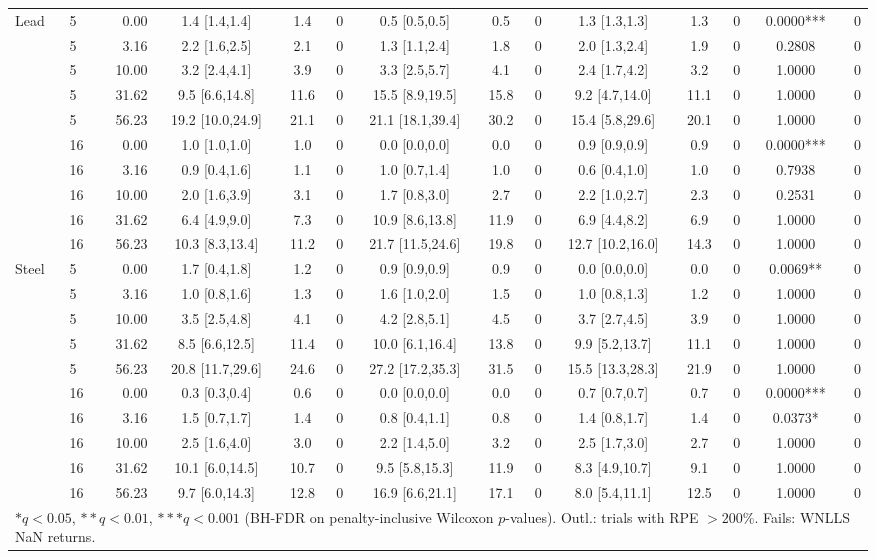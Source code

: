 \begin{table}[htbp]
\begin{tabular}{llr|ccc|ccc|ccc|cr}
\midrule Lead & 5 & 0.00 & 1.4 [1.4,1.4] & 1.4 & 0 & 0.5 [0.5,0.5] & 0.5 & 0 & 1.3 [1.3,1.3] & 1.3 & 0 & 0.0000*** & 0\\
 & 5 & 3.16 & 2.2 [1.6,2.5] & 2.1 & 0 & 1.3 [1.1,2.4] & 1.8 & 0 & 2.0 [1.3,2.4] & 1.9 & 0 & 0.2808 & 0\\
 & 5 & 10.00 & 3.2 [2.4,4.1] & 3.9 & 0 & 3.3 [2.5,5.7] & 4.1 & 0 & 2.4 [1.7,4.2] & 3.2 & 0 & 1.0000 & 0\\
 & 5 & 31.62 & 9.5 [6.6,14.8] & 11.6 & 0 & 15.5 [8.9,19.5] & 15.8 & 0 & 9.2 [4.7,14.0] & 11.1 & 0 & 1.0000 & 0\\
 & 5 & 56.23 & 19.2 [10.0,24.9] & 21.1 & 0 & 21.1 [18.1,39.4] & 30.2 & 0 & 15.4 [5.8,29.6] & 20.1 & 0 & 1.0000 & 0\\
 & 16 & 0.00 & 1.0 [1.0,1.0] & 1.0 & 0 & 0.0 [0.0,0.0] & 0.0 & 0 & 0.9 [0.9,0.9] & 0.9 & 0 & 0.0000*** & 0\\
 & 16 & 3.16 & 0.9 [0.4,1.6] & 1.1 & 0 & 1.0 [0.7,1.4] & 1.0 & 0 & 0.6 [0.4,1.0] & 1.0 & 0 & 0.7938 & 0\\
 & 16 & 10.00 & 2.0 [1.6,3.9] & 3.1 & 0 & 1.7 [0.8,3.0] & 2.7 & 0 & 2.2 [1.0,2.7] & 2.3 & 0 & 0.2531 & 0\\
 & 16 & 31.62 & 6.4 [4.9,9.0] & 7.3 & 0 & 10.9 [8.6,13.8] & 11.9 & 0 & 6.9 [4.4,8.2] & 6.9 & 0 & 1.0000 & 0\\
 & 16 & 56.23 & 10.3 [8.3,13.4] & 11.2 & 0 & 21.7 [11.5,24.6] & 19.8 & 0 & 12.7 [10.2,16.0] & 14.3 & 0 & 1.0000 & 0\\
\midrule Steel & 5 & 0.00 & 1.7 [0.4,1.8] & 1.2 & 0 & 0.9 [0.9,0.9] & 0.9 & 0 & 0.0 [0.0,0.0] & 0.0 & 0 & 0.0069** & 0\\
 & 5 & 3.16 & 1.0 [0.8,1.6] & 1.3 & 0 & 1.6 [1.0,2.0] & 1.5 & 0 & 1.0 [0.8,1.3] & 1.2 & 0 & 1.0000 & 0\\
 & 5 & 10.00 & 3.5 [2.5,4.8] & 4.1 & 0 & 4.2 [2.8,5.1] & 4.5 & 0 & 3.7 [2.7,4.5] & 3.9 & 0 & 1.0000 & 0\\
 & 5 & 31.62 & 8.5 [6.6,12.5] & 11.4 & 0 & 10.0 [6.1,16.4] & 13.8 & 0 & 9.9 [5.2,13.7] & 11.1 & 0 & 1.0000 & 0\\
 & 5 & 56.23 & 20.8 [11.7,29.6] & 24.6 & 0 & 27.2 [17.2,35.3] & 31.5 & 0 & 15.5 [13.3,28.3] & 21.9 & 0 & 1.0000 & 0\\
 & 16 & 0.00 & 0.3 [0.3,0.4] & 0.6 & 0 & 0.0 [0.0,0.0] & 0.0 & 0 & 0.7 [0.7,0.7] & 0.7 & 0 & 0.0000*** & 0\\
 & 16 & 3.16 & 1.5 [0.7,1.7] & 1.4 & 0 & 0.8 [0.4,1.1] & 0.8 & 0 & 1.4 [0.8,1.7] & 1.4 & 0 & 0.0373* & 0\\
 & 16 & 10.00 & 2.5 [1.6,4.0] & 3.0 & 0 & 2.2 [1.4,5.0] & 3.2 & 0 & 2.5 [1.7,3.0] & 2.7 & 0 & 1.0000 & 0\\
 & 16 & 31.62 & 10.1 [6.0,14.5] & 10.7 & 0 & 9.5 [5.8,15.3] & 11.9 & 0 & 8.3 [4.9,10.7] & 9.1 & 0 & 1.0000 & 0\\
 & 16 & 56.23 & 9.7 [6.0,14.3] & 12.8 & 0 & 16.9 [6.6,21.1] & 17.1 & 0 & 8.0 [5.4,11.1] & 12.5 & 0 & 1.0000 & 0\\
\bottomrule
\multicolumn{14}{l}{\footnotesize{$*q<0.05$, $**q<0.01$, $***q<0.001$ (BH-FDR on penalty-inclusive Wilcoxon $p$-values). Outl.: trials with RPE $>200\%$. Fails: WNLLS NaN returns.}}
\end{tabular}
\end{table}